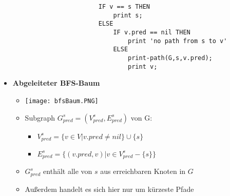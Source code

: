 \begin{itemize}
\begin{itemize}
\begin{verbatim}
                    IF v == s THEN
                        print s;
                    ELSE
                        IF v.pred == nil THEN
                            print 'no path from s to v'
                        ELSE
                            print-path(G,s,v.pred);
                            print v;
                    \end{verbatim}
            \end{itemize}

        \item \textbf{Abgeleiteter BFS-Baum}
            \begin{itemize}
                \item[] \texttt{[image: bfsBaum.PNG]}
                \item Subgraph $G^s_{pred} = (V^s_{pred},E^s_{pred})$ von G:
                    \begin{itemize}
                        \item $V^s_{pred} = \{v \in V | v.pred \neq nil\} \cup \{s\}$
                        \item $E^s_{pred} = \{(v.pred,v) | v \in V^s_{pred} - \{s\}\}$
                    \end{itemize}
                \item $G^s_{pred}$ enthält alle von $s$ aus erreichbaren Knoten in $G$
                \item Außerdem handelt es sich hier nur um kürzeste Pfade
            \end{itemize}
    \end{itemize}

